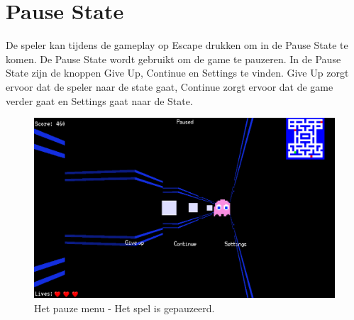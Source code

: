 \documentclass{report}
\begin{document}
  \section{Pause State} %
  \label{sec:pause_state}
  De speler kan tijdens de gameplay op Escape drukken om in de Pause State te komen. De Pause State wordt gebruikt om de game te pauzeren. In de Pause State zijn de knoppen Give Up, Continue en Settings te vinden. Give Up zorgt ervoor dat de speler naar de  state gaat, Continue zorgt ervoor dat de game verder gaat en Settings gaat naar de  State.
  \begin{figure}[h]
      \centering
      \includegraphics[width=.95\textwidth]{technisch verslag imgs/pause.png}
      \caption{Het pauze menu - Het spel is gepauzeerd.}
    \end{figure}
\end{document}
